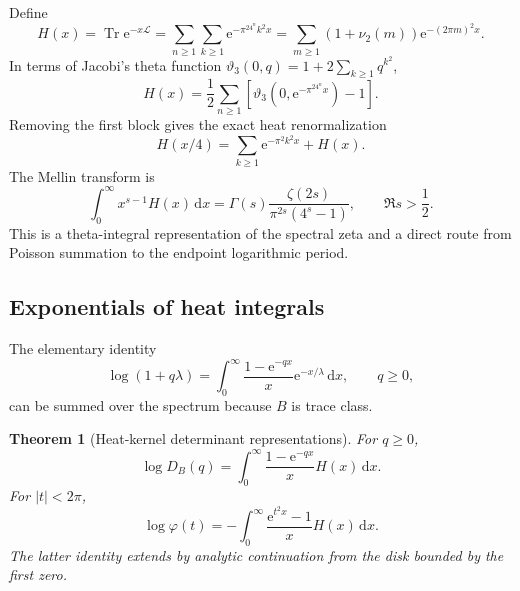\documentclass[11pt,oneside]{article}
\newtheorem{theorem}{Theorem}[section]
\theoremstyle{definition}
\newcommand{\dd}{\,\mathrm d}
\newcommand{\e}{\mathrm e}
\newcommand{\Tr}{\operatorname{Tr}}
\newcommand{\vtwo}{\nu_2}
\newcommand{\phiF}{\varphi}
\begin{document}
Define
\begin{equation}
 H(x)=\Tr\e^{-x\mathscr L}
 =\sum_{n\ge1}\sum_{k\ge1}\e^{-\pi^24^nk^2x}
 =\sum_{m\ge1}(1+\vtwo(m))\e^{-(2\pi m)^2x}.
 \label{p1:eq:heat-trace}
\end{equation}
In terms of Jacobi's theta function
\(\vartheta_3(0,q)=1+2\sum_{k\ge1}q^{k^2}\),
\begin{equation}
 H(x)=\frac12\sum_{n\ge1}
 \left[\vartheta_3(0,\e^{-\pi^24^nx})-1\right].
 \label{p1:eq:theta-heat}
\end{equation}
Removing the first block gives the exact heat renormalization
\begin{equation}
 H(x/4)=\sum_{k\ge1}\e^{-\pi^2k^2x}+H(x).
 \label{p1:eq:heat-renormalization}
\end{equation}
The Mellin transform is
\begin{equation}
 \int_0^\infty x^{s-1}H(x)\dd x
 =\Gamma(s)\frac{\zeta(2s)}{\pi^{2s}(4^s-1)},
 \qquad \Re s>\frac12.
 \label{p1:eq:heat-Mellin}
\end{equation}
This is a theta-integral representation of the spectral zeta and a direct route from
Poisson summation to the endpoint logarithmic period.

\subsection{Exponentials of heat integrals}

The elementary identity
\begin{equation}
 \log(1+q\lambda)=\int_0^\infty
 \frac{1-\e^{-qx}}x\e^{-x/\lambda}\dd x,
 \qquad q\ge0,
 \label{p1:eq:log-heat-elementary}
\end{equation}
can be summed over the spectrum because \(B\) is trace class.

\begin{theorem}[Heat-kernel determinant representations]
\label{p1:thm:heat-det}
For \(q\ge0\),
\begin{equation}
 \boxed{\quad
 \log D_B(q)=\int_0^\infty
 \frac{1-\e^{-qx}}x H(x)\dd x.
 \quad}
 \label{p1:eq:positive-heat-det}
\end{equation}
For \(|t|<2\pi\),
\begin{equation}
 \boxed{\quad
 \log\phiF(t)=-\int_0^\infty
 \frac{\e^{t^2x}-1}{x}H(x)\dd x.
 \quad}
 \label{p1:eq:real-heat-det}
\end{equation}
The latter identity extends by analytic continuation from the disk bounded by the first
zero.
\end{theorem}
\end{document}
